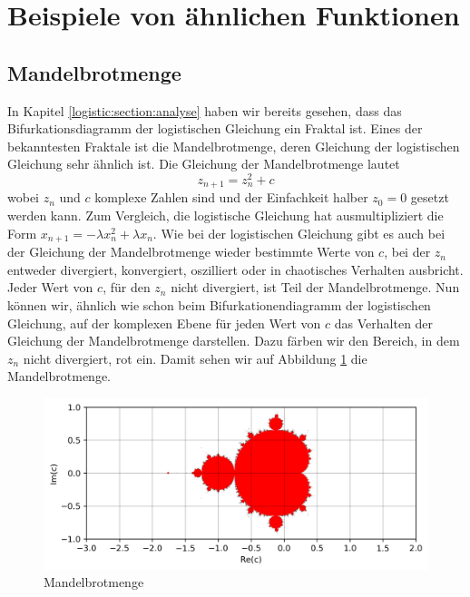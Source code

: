 %
%
%
\section{Beispiele von ähnlichen Funktionen
\label{logistic:section:beispiele}}
\subsection{Mandelbrotmenge}
In Kapitel \ref{logistic:section:analyse} 
haben wir bereits gesehen, 
dass das Bifurkationsdiagramm der logistischen Gleichung
ein Fraktal ist. 
Eines der bekanntesten Fraktale ist die Mandelbrotmenge,
deren Gleichung der logistischen Gleichung sehr ähnlich ist. 
Die Gleichung der Mandelbrotmenge lautet
\begin{equation}
    z_{n+1} = z_n^2 + c
    \label{eq:mandelbrot}
\end{equation}
wobei $z_n$ und $c$ komplexe Zahlen sind und 
der Einfachkeit halber $z_0 = 0$ gesetzt werden kann.
Zum Vergleich, die logistische Gleichung hat ausmultipliziert
die Form $x_{n+1} = -\lambda x_n^2 +\lambda x_n$. 
Wie bei der logistischen Gleichung gibt es auch
bei der Gleichung der Mandelbrotmenge wieder bestimmte
Werte von $c$, bei der $z_n$ entweder 
divergiert, 
konvergiert, 
oszilliert 
oder in chaotisches Verhalten ausbricht. 
Jeder Wert von $c$, für den $z_n$ nicht 
divergiert, ist Teil der Mandelbrotmenge. 
Nun können wir, ähnlich wie schon beim 
Bifurkationendiagramm der logistischen Gleichung, auf der
komplexen Ebene für jeden Wert von $c$ das Verhalten
der Gleichung der Mandelbrotmenge darstellen. 
Dazu färben wir den Bereich, in dem $z_n$ 
nicht divergiert, rot ein.
Damit sehen wir auf Abbildung \ref{fig:mandel_2d}
die Mandelbrotmenge. 
\begin{figure}
    \includegraphics[width=\linewidth]{papers/logistic/figures/mandel.png}
    \caption{Mandelbrotmenge}
    \label{fig:mandel_2d}
\end{figure}

